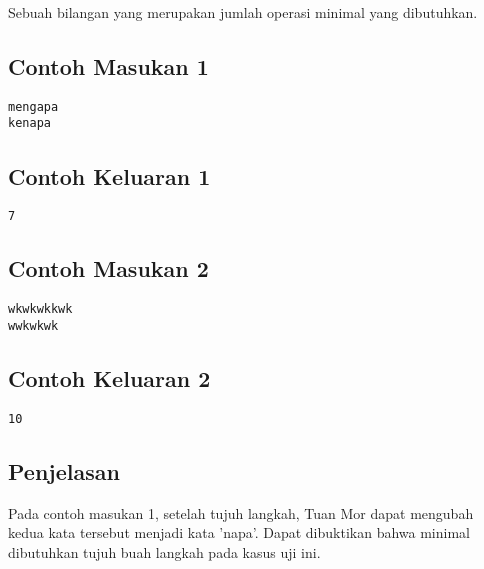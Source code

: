 \documentclass{article}
\begin{document}
Sebuah bilangan yang merupakan jumlah operasi minimal yang dibutuhkan.
\\

\begin{multicols}{2}
\subsection*{Contoh Masukan 1}
\begin{lstlisting}
mengapa
kenapa
\end{lstlisting}
\columnbreak
\subsection*{Contoh Keluaran 1}
\begin{lstlisting}
7
\end{lstlisting}
\vfill
\null
\end{multicols}

\begin{multicols}{2}
\subsection*{Contoh Masukan 2}
\begin{lstlisting}
wkwkwkkwk
wwkwkwk
\end{lstlisting}
\columnbreak
\subsection*{Contoh Keluaran 2}
\begin{lstlisting}
10
\end{lstlisting}
\vfill
\null
\end{multicols}

\subsection*{Penjelasan}
Pada contoh masukan 1, setelah tujuh langkah, Tuan Mor dapat mengubah kedua kata tersebut menjadi kata 'napa'.
Dapat dibuktikan bahwa minimal dibutuhkan tujuh buah langkah pada kasus uji ini.

\pagebreak
\end{document}
